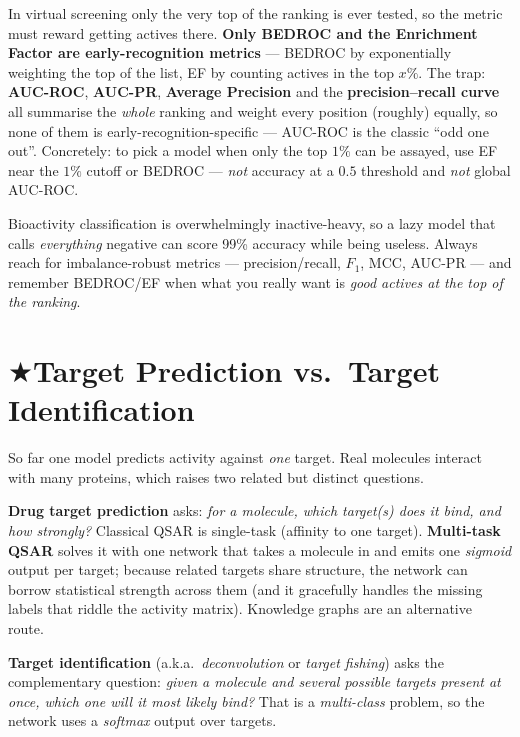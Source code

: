 \documentclass[11pt, oneside]{book}
\makeatletter
\newcommand{\starglyph}{\textcolor{stargold}{\ensuremath{\bigstar}}}
\newcommand{\starsec}[1]{%
  \texorpdfstring{\starglyph\hspace{0.4em}\textcolor{star@frame}{#1}}{#1}}
\makeatother
\begin{document}
\begin{starbox}[title={Exam-critical: which metrics reward \emph{early} recognition}]
In virtual screening only the very top of the ranking is ever tested, so the
metric must reward getting actives there. \textbf{Only BEDROC and the Enrichment
Factor are early-recognition metrics} --- BEDROC by exponentially weighting the top
of the list, EF by counting actives in the top $x\%$. The trap: \textbf{AUC-ROC},
\textbf{AUC-PR}, \textbf{Average Precision} and the \textbf{precision--recall curve}
all summarise the \emph{whole} ranking and weight every position (roughly) equally,
so none of them is early-recognition-specific --- AUC-ROC is the classic ``odd one
out''. Concretely: to pick a model when only the top $1\%$ can be assayed, use EF
near the $1\%$ cutoff or BEDROC --- \emph{not} accuracy at a $0.5$ threshold and
\emph{not} global AUC-ROC.
\end{starbox}

\begin{notebox}[title={Imbalance breaks accuracy}]
Bioactivity classification is overwhelmingly inactive-heavy, so a lazy model that
calls \emph{everything} negative can score 99\% accuracy while being useless.
Always reach for imbalance-robust metrics --- precision/recall, $F_1$, MCC, AUC-PR
--- and remember BEDROC/EF when what you really want is \emph{good actives at the
top of the ranking}.
\end{notebox}

\section{\starsec{Target Prediction vs.\ Target Identification}}

So far one model predicts activity against \emph{one} target. Real molecules
interact with many proteins, which raises two related but distinct questions.

\textbf{Drug target prediction} asks: \emph{for a molecule, which target(s) does it
bind, and how strongly?} Classical QSAR is single-task (affinity to one target).
\textbf{Multi-task QSAR} solves it with one network that takes a molecule in and
emits one \emph{sigmoid} output per target; because related targets share
structure, the network can borrow statistical strength across them (and it
gracefully handles the missing labels that riddle the activity matrix). Knowledge
graphs are an alternative route.

\textbf{Target identification} (a.k.a.\ \emph{deconvolution} or
\emph{target fishing}) asks the complementary question: \emph{given a molecule and
several possible targets present at once, which one will it most likely bind?}
That is a \emph{multi-class} problem, so the network uses a \emph{softmax} output
over targets.
\end{document}

